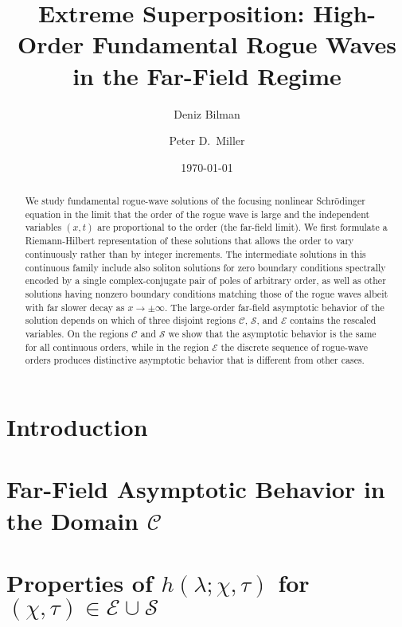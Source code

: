 \documentclass[11pt]{amsart}
\title{Extreme Superposition:  High-Order Fundamental Rogue Waves in the Far-Field Regime}
\author{Deniz Bilman}
\author{Peter D.~Miller}
\date{\today}
\theoremstyle{definition}
\theoremstyle{remark}
\newcommand{\channels}{\ensuremath{\mathcal{C}}}
\newcommand{\shelves}{\ensuremath{\mathcal{S}}}
\newcommand{\exterior}{\ensuremath{\mathcal{E}}}
\begin{document}
\begin{abstract}
We study fundamental rogue-wave solutions of the focusing nonlinear Schr\"odinger equation in the limit that the order of the rogue wave is large and the independent variables $(x,t)$ are proportional to the order (the far-field limit).  We first formulate a Riemann-Hilbert representation of these solutions that allows the order to vary continuously rather than by integer increments.  The intermediate solutions in this continuous family include also soliton solutions for zero boundary conditions spectrally encoded by  a single complex-conjugate pair of poles of arbitrary order, as well as other solutions having nonzero boundary conditions matching those of the rogue waves albeit with far slower decay as $x\to\pm\infty$.  The large-order far-field asymptotic behavior of the solution depends on which of three disjoint regions $\channels$, $\shelves$, and $\exterior$ contains the rescaled variables.  On the regions $\channels$ and $\shelves$ we show that the asymptotic behavior is the same for all continuous orders, while in the region $\exterior$ the discrete sequence of rogue-wave orders produces distinctive asymptotic behavior that is different from other cases.
\end{abstract}

\maketitle

\section{Introduction}


%

\section{Far-Field Asymptotic Behavior in the Domain $\channels$}


\section{Properties of $h(\lambda;\chi,\tau)$ for $(\chi,\tau)\in\exterior\cup\shelves$}
\label{sec:GenusZeroModification}

\end{document}
